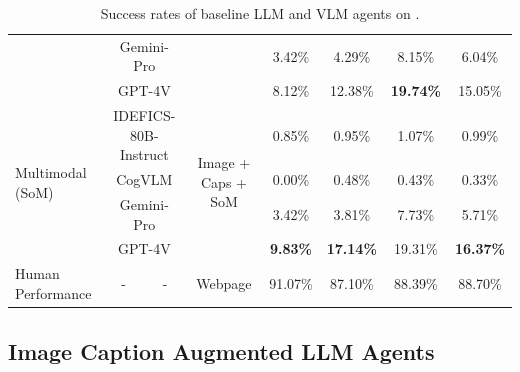 \begin{table}[t]
{\begin{tabular}{@{}lccccccc@{}}
                        & \multicolumn{2}{c}{Gemini-Pro} &  & 3.42\% & 4.29\% & 8.15\% &  6.04\% \\ 
                        & \multicolumn{2}{c}{GPT-4V} &  & 8.12\%   &  12.38\% &  \textbf{19.74\%} & 15.05\% \\
\midrule
\multirow{4}{*}{Multimodal (SoM)} &  \multicolumn{2}{c}{IDEFICS-80B-Instruct} & \multirow{4}{*}{Image + Caps + SoM} & 0.85\% & 0.95\% & 1.07\% & 0.99\% \\ 
                        & \multicolumn{2}{c}{CogVLM} &  & 0.00\% & 0.48\% & 0.43\% &  0.33\% \\ 
                        & \multicolumn{2}{c}{Gemini-Pro} &  & 3.42\% & 3.81\% & 7.73\% & 5.71\% \\ 
                        & \multicolumn{2}{c}{GPT-4V} &  &  \textbf{9.83\%} &  \textbf{17.14\%} & 19.31\% & \textbf{16.37\%}  \\ 
\midrule
\multirow{1}{*}{Human Performance} &   - & - & \multirow{1}{*}{Webpage} & 91.07\% &  87.10\% & 88.39\% &  88.70\% \\ 
\bottomrule
\end{tabular}
}
\caption{Success rates of baseline LLM and VLM agents on \BenchmarkName{}.}  \label{tab:results}
\end{table}


\subsection{Image Caption Augmented LLM Agents}

